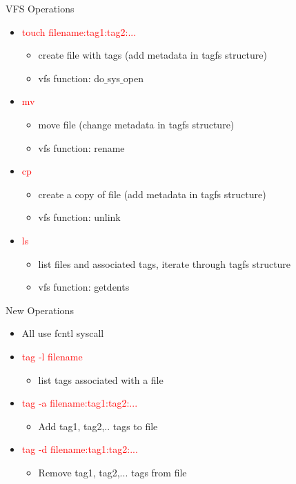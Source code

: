 \documentclass{beamer}
\begin{document}
\begin{frame}{VFS Operations}
    \begin{itemize}
        \item \textcolor{red}{touch filename:tag1:tag2:...}
            \begin{itemize}
                \item{create file with tags (add metadata in tagfs structure)}
                \item{vfs function: do$\_$sys$\_$open}
            \end{itemize}
        \item \textcolor{red}{mv}
            \begin{itemize}
                \item{move file (change metadata in tagfs structure)}
                \item{vfs function: rename}
            \end{itemize}
        \item \textcolor{red}{cp}
            \begin{itemize}
                \item{create a copy of file (add metadata in tagfs structure)}
                \item{vfs function: unlink}
            \end{itemize}
        \item \textcolor{red}{ls}
            \begin{itemize}
                \item{list files and associated tags, iterate through tagfs structure}
                \item{vfs function: getdents}
            \end{itemize}
    \end{itemize}
\end{frame}

\begin{frame}{New Operations}
    \begin{itemize}
        \item {All use fcntl syscall}
        \item \textcolor{red}{ tag -l filename}
            \begin{itemize}
                \item{list tags associated with a file}
            \end{itemize}
        \item \textcolor{red}{ tag -a filename:tag1:tag2:...}
            \begin{itemize}
                \item{Add tag1, tag2,.. tags to file}
            \end{itemize}
        \item \textcolor{red}{ tag -d filename:tag1:tag2:...}
            \begin{itemize}
                \item{Remove tag1, tag2,... tags from file}
            \end{itemize}
    \end{itemize}
\end{frame}
\end{document}

